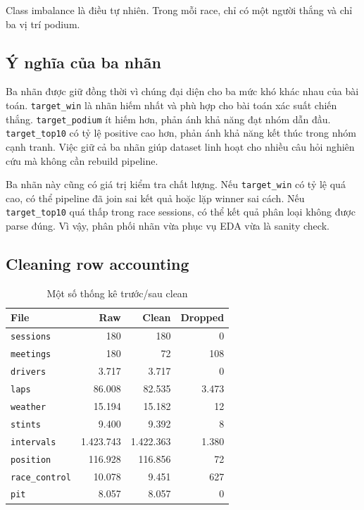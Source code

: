 \documentclass[conference]{IEEEtran}
\begin{document}
Class imbalance là điều tự nhiên. Trong mỗi race, chỉ có một người thắng và chỉ ba vị trí podium.

\subsection{Ý nghĩa của ba nhãn}
Ba nhãn được giữ đồng thời vì chúng đại diện cho ba mức khó khác nhau của bài toán. \texttt{target\_win} là nhãn hiếm nhất và phù hợp cho bài toán xác suất chiến thắng. \texttt{target\_podium} ít hiếm hơn, phản ánh khả năng đạt nhóm dẫn đầu. \texttt{target\_top10} có tỷ lệ positive cao hơn, phản ánh khả năng kết thúc trong nhóm cạnh tranh. Việc giữ cả ba nhãn giúp dataset linh hoạt cho nhiều câu hỏi nghiên cứu mà không cần rebuild pipeline.

Ba nhãn này cũng có giá trị kiểm tra chất lượng. Nếu \texttt{target\_win} có tỷ lệ quá cao, có thể pipeline đã join sai kết quả hoặc lặp winner sai cách. Nếu \texttt{target\_top10} quá thấp trong race sessions, có thể kết quả phân loại không được parse đúng. Vì vậy, phân phối nhãn vừa phục vụ EDA vừa là sanity check.

\subsection{Cleaning row accounting}

\begin{table}[htbp]
\caption{Một số thống kê trước/sau clean}
\label{tab:rows}
\centering
\begin{tabular}{lrrr}
\toprule
File & Raw & Clean & Dropped \\
\midrule
\texttt{sessions} & 180 & 180 & 0 \\
\texttt{meetings} & 180 & 72 & 108 \\
\texttt{drivers} & 3.717 & 3.717 & 0 \\
\texttt{laps} & 86.008 & 82.535 & 3.473 \\
\texttt{weather} & 15.194 & 15.182 & 12 \\
\texttt{stints} & 9.400 & 9.392 & 8 \\
\texttt{intervals} & 1.423.743 & 1.422.363 & 1.380 \\
\texttt{position} & 116.928 & 116.856 & 72 \\
\texttt{race\_control} & 10.078 & 9.451 & 627 \\
\texttt{pit} & 8.057 & 8.057 & 0 \\
\bottomrule
\end{tabular}
\end{table}
\end{document}
